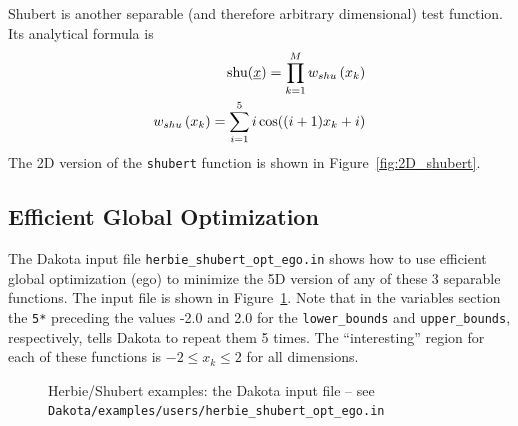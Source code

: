 Shubert is another separable (and therefore arbitrary dimensional)
test function. Its analytical formula is
\begin{eqnarray*}
{\rm shu}(\underline{x})= \prod_{k=1}^M w_{shu}\left(x_k\right) \\
w_{shu}\left(x_k\right)= \sum_{i=1}^5 i\cos((i+1)x_k+i)
\end{eqnarray*}
The 2D version of the \texttt{shubert} function is shown in
Figure~\ref{fig:2D_shubert}.

\subsection{Efficient Global Optimization}

The Dakota input file \texttt{herbie\_shubert\_opt\_ego.in} shows how
to use efficient global optimization (ego) to minimize the 5D version
of any of these 3 separable functions. The input file is shown in
Figure~\ref{additional:herbie_shubert_ego}. Note that in the variables
section the \texttt{5*} preceding the values -2.0 and 2.0 for the
\texttt{lower\_bounds} and \texttt{upper\_bounds}, respectively, tells
Dakota to repeat them 5 times. The ``interesting'' region for each
of these functions is $-2\le x_k \le 2$ for all dimensions.

\begin{figure}[ht!]
  \centering
  \begin{small}
    \begin{bigbox}
    \end{bigbox}
  \end{small}
  \caption{Herbie/Shubert examples: the Dakota input file --
see \texttt{Dakota/examples/users/herbie\_shubert\_opt\_ego.in} }
  \label{additional:herbie_shubert_ego}
\end{figure}


